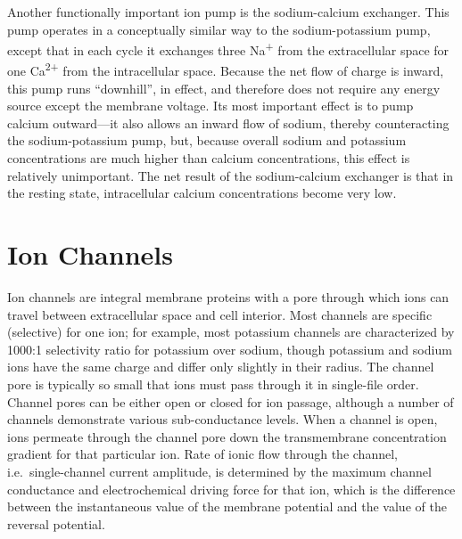 \documentclass[]{book}
\begin{document}
Another functionally important ion pump is the sodium-calcium exchanger. This pump operates in a conceptually similar way to the sodium-potassium pump, except that in each cycle it exchanges three Na\textsuperscript{+} from the extracellular space for one Ca\textsuperscript{2+} from the intracellular space. Because the net flow of charge is inward, this pump runs ``downhill'', in effect, and therefore does not require any energy source except the membrane voltage. Its most important effect is to pump calcium outward---it also allows an inward flow of sodium, thereby counteracting the sodium-potassium pump, but, because overall sodium and potassium concentrations are much higher than calcium concentrations, this effect is relatively unimportant. The net result of the sodium-calcium exchanger is that in the resting state, intracellular calcium concentrations become very low.

\hypertarget{ion-channels}{%
\section{Ion Channels}\label{ion-channels}}

Ion channels are integral membrane proteins with a pore through which ions can travel between extracellular space and cell interior. Most channels are specific (selective) for one ion; for example, most potassium channels are characterized by 1000:1 selectivity ratio for potassium over sodium, though potassium and sodium ions have the same charge and differ only slightly in their radius. The channel pore is typically so small that ions must pass through it in single-file order. Channel pores can be either open or closed for ion passage, although a number of channels demonstrate various sub-conductance levels. When a channel is open, ions permeate through the channel pore down the transmembrane concentration gradient for that particular ion. Rate of ionic flow through the channel, i.e.~single-channel current amplitude, is determined by the maximum channel conductance and electrochemical driving force for that ion, which is the difference between the instantaneous value of the membrane potential and the value of the reversal potential.
\end{document}
